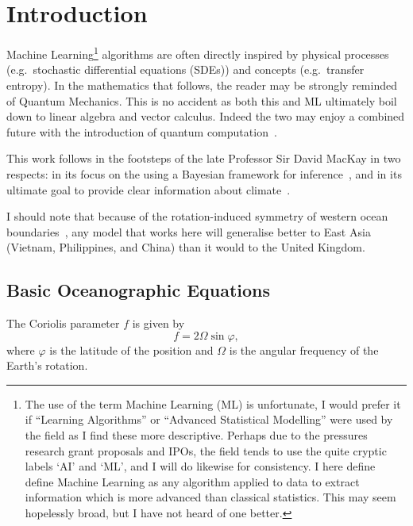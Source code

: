 \section{Introduction}
\label{sec:1_Introduction}

Machine Learning\footnote{The use of the term Machine Learning (ML) is unfortunate,
I would prefer it if ``Learning Algorithms'' or ``Advanced Statistical Modelling''
 were used by the field as I find these more descriptive.
  Perhaps due to the pressures research grant proposals and IPOs,
   the field tends to use the quite cryptic labels `AI' and `ML',
   and I will do likewise for consistency.
   I here define define Machine Learning as any algorithm applied to data
    to extract information which is more advanced than classical statistics.
    This may seem hopelessly broad, but I have not heard of one better. }
algorithms are often directly inspired by physical processes (e.g.\
stochastic differential equations (SDEs)) and concepts (e.g.\ transfer entropy).
In the mathematics that follows, the reader may be strongly reminded of Quantum Mechanics.
This is no accident as both this and ML ultimately boil down to linear algebra and vector calculus.
Indeed the two may enjoy a combined future with the introduction of quantum computation~\cite{biamonte2017quantum}.

This work follows in the footsteps of the late Professor Sir David MacKay
in two respects: in its focus on the using a Bayesian framework for inference~\cite{ITILA, MacKay91},
and in its ultimate goal to provide clear information about climate~\cite{mackay2008sustainable}.

I should note that because of the rotation-induced symmetry of western ocean boundaries~\cite{hogg1995western},
 any model that works here will generalise better to East Asia (Vietnam, Philippines,
  and China) than it would to the United Kingdom.

\subsection{Basic Oceanographic Equations}
The Coriolis parameter $f$ is given by
\begin{equation}
f=2 \Omega \sin \varphi,
\label{eq:coriolis}
\end{equation}
where $\varphi$ is the latitude of the position and $\Omega$ is the angular
 frequency of the Earth's rotation.

